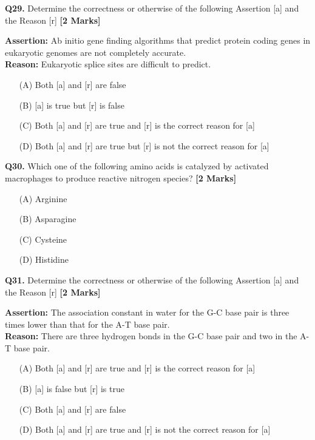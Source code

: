 \documentclass[11pt]{article}
\newcommand{\questionb}[2]{
    \noindent\textbf{Q#2.} #1 \hfill \textbf{[2 Marks]}
}
\begin{document}
\questionb{Determine the correctness or otherwise of the following Assertion [a] and the Reason [r]}{29}
\textbf{Assertion:} Ab initio gene finding algorithms that predict protein coding genes in eukaryotic genomes are not completely accurate. \\
\textbf{Reason:} Eukaryotic splice sites are difficult to predict.
\begin{enumerate}
    \item[(A)] Both [a] and [r] are false
    \item[(B)] [a] is true but [r] is false
    \item[(C)] Both [a] and [r] are true and [r] is the correct reason for [a]
    \item[(D)] Both [a] and [r] are true but [r] is not the correct reason for [a]
\end{enumerate}
\vspace{0.5cm}

\questionb{Which one of the following amino acids is catalyzed by activated macrophages to produce reactive nitrogen species?}{30}
\begin{enumerate}
    \item[(A)] Arginine
    \item[(B)] Asparagine
    \item[(C)] Cysteine
    \item[(D)] Histidine
\end{enumerate}
\vspace{0.5cm}

\questionb{Determine the correctness or otherwise of the following Assertion [a] and the Reason [r]}{31}
\textbf{Assertion:} The association constant in water for the G-C base pair is three times lower than that for the A-T base pair. \\
\textbf{Reason:} There are three hydrogen bonds in the G-C base pair and two in the A-T base pair.
\begin{enumerate}
    \item[(A)] Both [a] and [r] are true and [r] is the correct reason for [a]
    \item[(B)] [a] is false but [r] is true
    \item[(C)] Both [a] and [r] are false
    \item[(D)] Both [a] and [r] are true and [r] is not the correct reason for [a]
\end{enumerate}
\vspace{0.5cm}
\end{document}
